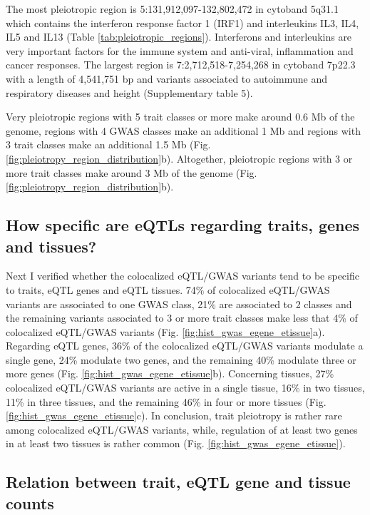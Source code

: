 The most pleiotropic region is 5:131,912,097-132,802,472 in cytoband 5q31.1 which contains the interferon response factor 1
(IRF1) and interleukins IL3, IL4, IL5 and IL13 (Table \ref{tab:pleiotropic_regions}).
%
Interferons and interleukins are very important factors for the immune system and anti-viral, inflammation and cancer responses.
%
The largest region is 7:2,712,518-7,254,268 in cytoband 7p22.3 with a length of 4,541,751 bp and variants associated to
autoimmune and respiratory diseases and height (Supplementary table 5).

Very pleiotropic regions with 5 trait classes or more make around 0.6 Mb of the genome,
regions with 4 GWAS classes make an additional 1 Mb and regions with 3 trait classes make an additional 1.5 Mb (Fig. \ref{fig:pleiotropy_region_distribution}b).
%
Altogether, pleiotropic regions with 3 or more trait classes make around 3 Mb of the genome (Fig. \ref{fig:pleiotropy_region_distribution}b).

\subsection*{How specific are eQTLs regarding traits, genes and tissues?}

Next I verified whether the colocalized eQTL/GWAS variants tend to be specific to traits, eQTL genes and eQTL tissues.
%
74\% of colocalized eQTL/GWAS variants are associated to one GWAS class, 21\% are associated to 2 classes and the remaining variants associated to
3 or more trait classes make less that 4\% of colocalized eQTL/GWAS variants (Fig. \ref{fig:hist_gwas_egene_etissue}a).
%
Regarding eQTL genes, 36\% of the colocalized eQTL/GWAS variants modulate a single gene, 24\% modulate two genes, and the
remaining 40\% modulate three or more genes (Fig. \ref{fig:hist_gwas_egene_etissue}b).
%
Concerning tissues, 27\% colocalized eQTL/GWAS variants are active in a single tissue, 16\% in two tissues, 11\% in three
tissues, and the remaining 46\% in four or more tissues (Fig. \ref{fig:hist_gwas_egene_etissue}c).
%
In conclusion, trait pleiotropy is rather rare among colocalized eQTL/GWAS variants, while, regulation of at least two
genes in at least two tissues is rather common (Fig. \ref{fig:hist_gwas_egene_etissue}).

\subsection*{Relation between trait, eQTL gene and tissue counts}

